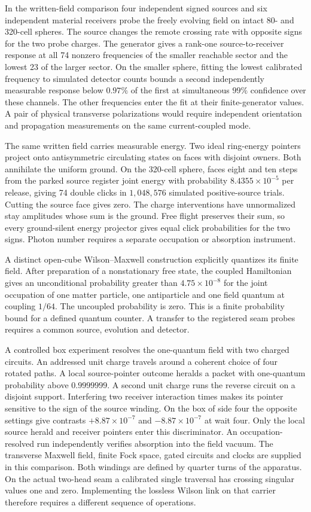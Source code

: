 In the written-field comparison four independent signed sources and six
independent material receivers probe the freely evolving field on intact
80- and 320-cell spheres. The source changes the remote crossing rate with
opposite signs for the two probe charges. The generator gives a rank-one
source-to-receiver response at all 74 nonzero frequencies of the smaller
reachable sector and the lowest 23 of the larger sector. On the smaller
sphere, fitting the lowest calibrated frequency to simulated detector counts
bounds a second independently measurable response below $0.97\%$ of the
first at simultaneous $99\%$ confidence over these channels. The other
frequencies enter the fit at their finite-generator values. A pair of
physical transverse polarizations would require independent orientation
and propagation measurements on the same current-coupled mode.

The same written field carries measurable energy. Two ideal ring-energy
pointers project onto antisymmetric circulating states on faces with
disjoint owners. Both annihilate the uniform ground. On the 320-cell
sphere, faces eight and ten steps from the parked source register joint
energy with probability $8.4355\times10^{-5}$ per release, giving 74
double clicks in $1{,}048{,}576$ simulated positive-source trials. Cutting
the source face gives zero. The charge interventions have unnormalized
stay amplitudes whose sum is the ground. Free flight preserves their sum,
so every ground-silent energy projector gives equal click probabilities
for the two signs. Photon number requires a separate occupation or
absorption instrument.

A distinct open-cube Wilson--Maxwell construction explicitly quantizes its
finite field. After preparation of a nonstationary free state, the coupled
Hamiltonian gives an unconditional probability greater than
$4.75\times10^{-8}$ for the joint occupation of one matter particle, one
antiparticle and one field quantum at coupling $1/64$. The uncoupled
probability is zero. This is a finite probability bound for a defined
quantum counter. A transfer to the registered seam probes requires a common
source, evolution and detector.

A controlled box experiment resolves the one-quantum field with two
charged circuits. An addressed unit charge travels around a coherent
choice of four rotated paths. A local source-pointer outcome heralds a
packet with one-quantum probability above $0.9999999$. A second unit
charge runs the reverse circuit on a disjoint support. Interfering two
receiver interaction times makes its pointer sensitive to the sign of the
source winding. On the box of side four the opposite settings give
contrasts $+8.87\times10^{-7}$ and $-8.87\times10^{-7}$ at wait four.
Only the local source herald and receiver pointers enter this
discriminator. An occupation-resolved run independently verifies
absorption into the field vacuum. The transverse Maxwell field, finite
Fock space, gated circuits and clocks are supplied in this comparison.
Both windings are defined by quarter turns of the apparatus. On the
actual two-head seam a calibrated single traversal has crossing
singular values one and zero. Implementing the lossless Wilson link
on that carrier therefore requires a different sequence of operations.

